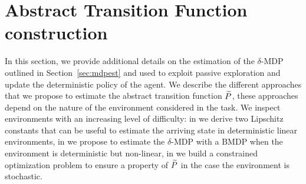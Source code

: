 \section{Abstract Transition Function construction}\label{sec:absmdp}
In this section, we provide additional details on the estimation of the $\delta$-\ac{MDP} outlined in Section~\ref{sec:mdpest} and used to exploit passive exploration and update the deterministic policy of the agent. We describe the different approaches that we propose to estimate the abstract transition function $\widetilde{P}$, these approaches depend on the nature of the environment considered in the task. We inspect environments with an increasing level of difficulty: in  we derive two Lipschitz constants that can be useful to estimate the arriving state in deterministic linear environments, in  we propose to estimate the $\delta$-\ac{MDP} with a \ac{BMDP} when the environment is deterministic but non-linear, in  we build a constrained optimization problem to ensure a property of $\widetilde{P}$ in the case the environment is stochastic.


